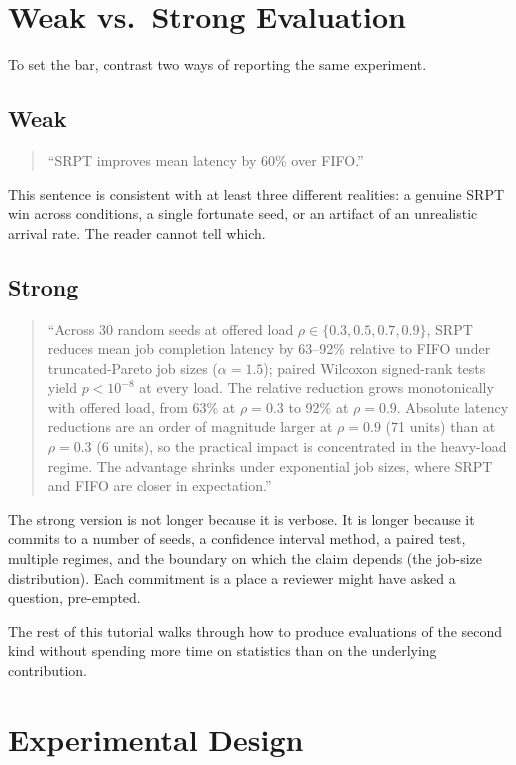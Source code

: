 \documentclass[11pt]{article}
\begin{document}
\section{Weak vs.\ Strong Evaluation}
\label{sec:weak-vs-strong}

To set the bar, contrast two ways of reporting the same experiment.

\subsection*{Weak}
\begin{quote}
``SRPT improves mean latency by 60\% over FIFO.''
\end{quote}

This sentence is consistent with at least three different realities: a genuine SRPT win across conditions, a single fortunate seed, or an artifact of an unrealistic arrival rate. The reader cannot tell which.

\subsection*{Strong}
\begin{quote}
``Across 30 random seeds at offered load $\rho \in \{0.3, 0.5, 0.7, 0.9\}$, SRPT reduces mean job completion latency by 63--92\% relative to FIFO under truncated-Pareto job sizes ($\alpha=1.5$); paired Wilcoxon signed-rank tests yield $p < 10^{-8}$ at every load. The relative reduction grows monotonically with offered load, from 63\% at $\rho=0.3$ to 92\% at $\rho=0.9$. Absolute latency reductions are an order of magnitude larger at $\rho = 0.9$ (71 units) than at $\rho = 0.3$ (6 units), so the practical impact is concentrated in the heavy-load regime. The advantage shrinks under exponential job sizes, where SRPT and FIFO are closer in expectation.''
\end{quote}

The strong version is not longer because it is verbose. It is longer because it commits to a number of seeds, a confidence interval method, a paired test, multiple regimes, and the boundary on which the claim depends (the job-size distribution). Each commitment is a place a reviewer might have asked a question, pre-empted.

The rest of this tutorial walks through how to produce evaluations of the second kind without spending more time on statistics than on the underlying contribution.

\section{Experimental Design}
\label{sec:design}
\end{document}
